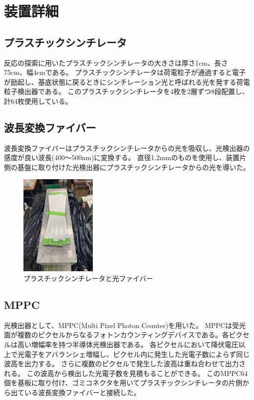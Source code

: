 \section{装置詳細}
\subsection{プラスチックシンチレータ}
反応の探索に用いたプラスチックシンチレータの大きさは厚さ1cm、長さ75cm、幅4cmである。
プラスチックシンチレータは荷電粒子が通過すると電子が励起し、基底状態に戻るときにシンチレーション光と呼ばれる光を発する荷電粒子検出器である。
このプラスチックシンチレータを4枚を2層ずつ8段配置し、計64枚使用している。

\subsection{波長変換ファイバー}
波長変換ファイバーはプラスチックシンチレータからの光を吸収し、光検出器の感度が良い波長(400～500nm)に変換する。
直径1.2mmのものを使用し、装置片側の基盤に取り付けた光検出器にプラスチックシンチレータからの光を導いた。

\begin{figure}[H]
    \centering
    \includegraphics[height=5cm]{img/Scinti.jpeg}
    \caption{プラスチックシンチレータと光ファイバー}
\end{figure}

\subsection{MPPC}
光検出器として、MPPC(Multi Pixel Photon Counter)を用いた。
MPPCは受光面が複数のピクセルからなるフォトンカウンティングデバイスである。各ピクセルは高い増幅率を持つ半導体光検出器である。
各ピクセルにおいて降伏電圧以上で光電子をアバランシェ増幅し、ピクセル内に発生した光電子数によらず同じ波高を出力する。
さらに複数のピクセルで発生した波高は重ね合わせて出力される。
この波高から検出した光電子数を見積もることができる。
このMPPC64個を基板に取り付け、ゴミコネクタを用いてプラスチックシンチレータの片側から出ている波長変換ファイバーと接続した。

